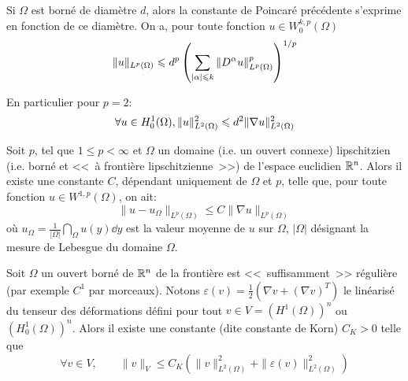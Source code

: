 \medskip

\begin{theoreme}
Si $\Omega$ est borné de diamètre $d$, alors la constante de Poincaré
précédente s'exprime en fonction de ce diamètre. On a,
pour toute fonction $u\in W_0^{k,p}(\Omega)$
\begin{equation}
\|u\|_{L^p(\Omega)} \leqslant d^p \left( \displaystyle\sum_{|\alpha|\leqslant k} \|D^\alpha u\|^p_{L^p(\Omega)}\right)^{1/p}
\end{equation}
\end{theoreme}

En particulier pour $p=2$:
\begin{equation} \colorred\forall u\in H^1_0(\Omega), \|u\|^2_{L^2(\Omega)} \le d^2
\|\nabla u\|^2_{L^2(\Omega)} \end{equation}


\medskip

\begin{theoreme}
Soit $p$, tel que $1 \le p <\infty$ et $\Omega$ un domaine (i.e. un ouvert  connexe) lipschitzien
(i.e. borné et <<~à frontière lipschitzienne~>>) de l'espace euclidien
$\mathbb R^n$.
Alors il existe une constante $C$, dépendant uniquement de $\Omega$ et $p$, telle que,
pour toute fonction $u\in W^{1,p}(\Omega)$, on ait:
\begin{equation}
\|u-u_\Omega\|_{L^p(\Omega)} \le C \|\nabla u\|_{L^p(\Omega)}
\end{equation}
où $u_\Omega=\frac1{|\Omega|}\dint_\Omega u(y)\dd y$ est la valeur
moyenne de $u$ sur $\Omega$, $|\Omega|$ désignant la mesure de Lebesgue
du domaine $\Omega$.
\end{theoreme}


\bigskip
\begin{theoreme}
Soit $\Omega$ un ouvert borné de $\mathbb R^n$ de la frontière est <<~suffisamment~>> régulière
(par exemple $C^1$ par morceaux).
Notons $\varepsilon(v)=\frac{1}{2}\left(\nabla v + (\nabla v)^T \right)$ le linéarisé du
tenseur des déformations défini pour tout $v\in V=\left(H^1(\Omega)\right)^n$ ou
$\left(H^1_0(\Omega)\right)^n$.
Alors il existe une constante (dite constante de Korn) $C_K>0$ telle que
\begin{equation}
\forall v\in V, \qquad
 \|v\|_{V} \le C_K \left(  \|v\|^2_{L^2(\Omega)}+ \|\varepsilon(v)\|^2_{L^2(\Omega)}
\right)
\end{equation}
\end{theoreme}

